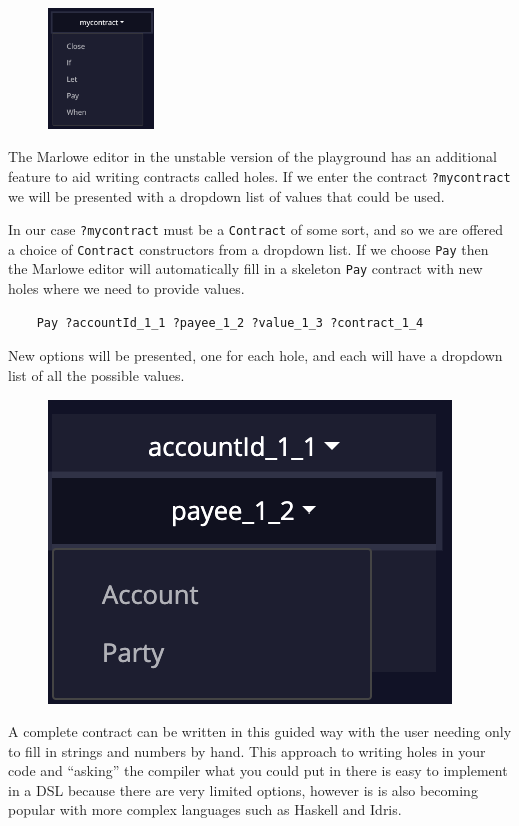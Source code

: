 \documentclass[runningheads]{llncs}
\renewcommand{\lstinline}[1]{\texttt{#1}}
\begin{document}
\begin{figure}
    \vspace*{-0.3in}
    \includegraphics[width=0.25\textwidth]{hole_options.png}
\end{figure}

The Marlowe editor in the unstable version of the playground has an additional feature to aid writing contracts called holes. If we enter the contract \lstinline{?mycontract}
we will be presented with a dropdown list of values that could be used.

In our case \lstinline{?mycontract} must be a \lstinline{Contract} of some sort, and so we are offered a choice of \lstinline{Contract} constructors from a dropdown list. If we choose \lstinline{Pay} then the Marlowe editor will automatically fill in a skeleton \lstinline{Pay} contract with new holes where we need to provide values.
\begin{verbatim}
    Pay ?accountId_1_1 ?payee_1_2 ?value_1_3 ?contract_1_4
\end{verbatim}
New options will be presented, one for each hole, and each will have a dropdown list of all the possible values.

\begin{figure}
    \vspace*{-0.3in}
    \includegraphics[scale=0.2]{hole_options_2.png}
\end{figure}
A complete contract can be written in this guided way with the user needing only to fill in strings and numbers by hand. This approach to writing holes in your code and ``asking'' the compiler what you could put in there is easy to implement in a DSL because there are very limited options, however is is also becoming popular with more complex languages such as Haskell and Idris.
\end{document}
